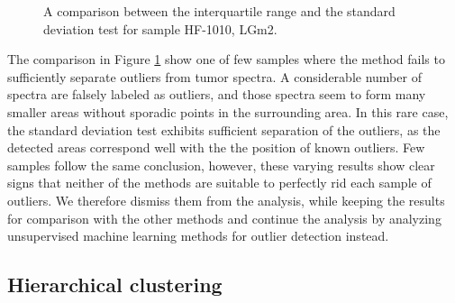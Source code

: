 \begin{figure}[h]

    \centering
    \qquad
    \caption{A comparison between the interquartile range and the standard deviation test for sample HF-1010, LGm2.
\label{fig:HF1010comp}}%
\end{figure}

The comparison in Figure \ref{fig:HF1010comp} show one of few samples where the method fails to sufficiently separate outliers from tumor spectra. A considerable number of spectra are falsely labeled as outliers, and those spectra seem to form many smaller areas without sporadic points in the surrounding area. In this rare case, the standard deviation test exhibits sufficient separation of the outliers, as the detected areas correspond well with the the position of known outliers. 
Few samples follow the same conclusion, however, these varying results show clear signs that neither of the methods are suitable to perfectly rid each sample of outliers. We therefore dismiss them from the analysis, while keeping the results for comparison with the other methods and continue the analysis by analyzing unsupervised machine learning methods for outlier detection instead.

\subsection{Hierarchical clustering}

